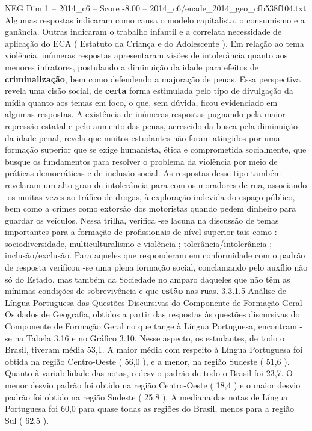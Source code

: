 \begin{textsample}{NEG Dim 1 – 2014\_c6 – Score -8.00 – 2014\_c6/enade\_2014\_geo\_cfb538f104.txt}
Algumas respostas indicaram como causa o modelo capitalista, o consumismo e a ganância.
Outras indicaram o trabalho infantil e a correlata necessidade de aplicação do ECA ( Estatuto da Criança e do Adolescente ).
Em relação ao tema violência, inúmeras respostas apresentaram visões de intolerância quanto aos menores infratores, postulando a diminuição da idade para efeitos de \textbf{criminalização}, bem como defendendo a majoração de penas.
Essa perspectiva revela uma cisão social, de \textbf{certa} forma estimulada pelo tipo de divulgação da mídia quanto aos temas em foco, o que, sem dúvida, ficou evidenciado em algumas respostas.
A existência de inúmeras respostas pugnando pela maior repressão estatal e pelo aumento das penas, acrescido da busca pela diminuição da idade penal, revela que muitos estudantes não foram atingidos por uma formação superior que se exige humanista, ética e comprometida socialmente, que busque os fundamentos para resolver o problema da violência por meio de práticas democráticas e de inclusão social.
As respostas desse tipo também revelaram um alto grau de intolerância para com os moradores de rua, associando -os muitas vezes ao tráfico de drogas, à exploração indevida do espaço público, bem como a crimes como extorsão dos motoristas quando pedem dinheiro para guardar os veículos.
Nessa trilha, verifica -se lacuna na discussão de temas importantes para a formação de profissionais de nível superior tais como : sociodiversidade, multiculturalismo e violência ; tolerância/intolerância ; inclusão/exclusão.
Para aqueles que responderam em conformidade com o padrão de resposta verificou -se uma plena formação social, conclamando pelo auxílio não só do Estado, mas também da Sociedade no amparo daqueles que não têm as mínimas condições de sobrevivência e que \textbf{estão} nas ruas. 3.3.1.5 Análise de Língua Portuguesa das Questões Discursivas do Componente de Formação Geral Os dados de Geografia, obtidos a partir das respostas às questões discursivas do Componente de Formação Geral no que tange à Língua Portuguesa, encontram -se na Tabela 3.16 e no Gráfico 3.10.
Nesse aspecto, os estudantes, de todo o Brasil, tiveram média 53,1.
A maior média com respeito à Língua Portuguesa foi obtida na região Centro-Oeste ( 56,0 ), e a menor, na região Sudeste ( 51,6 ).
Quanto à variabilidade das notas, o desvio padrão de todo o Brasil foi 23,7.
O menor desvio padrão foi obtido na região Centro-Oeste ( 18,4 ) e o maior desvio padrão foi obtido na região Sudeste ( 25,8 ).
A mediana das notas de Língua Portuguesa foi 60,0 para quase todas as regiões do Brasil, menos para a região Sul ( 62,5 ).

\end{textsample}
